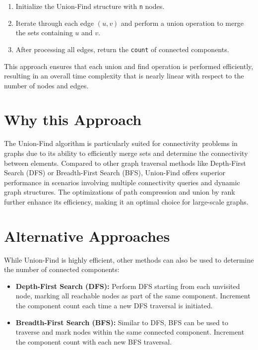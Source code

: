 \begin{enumerate}
    \item Initialize the Union-Find structure with \texttt{n} nodes.
    \item Iterate through each edge \((u, v)\) and perform a union operation to merge the sets containing \(u\) and \(v\).
    \item After processing all edges, return the \texttt{count} of connected components.
\end{enumerate}

This approach ensures that each union and find operation is performed efficiently, resulting in an overall time complexity that is nearly linear with respect to the number of nodes and edges.

\section*{Why this Approach}

The Union-Find algorithm is particularly suited for connectivity problems in graphs due to its ability to efficiently merge sets and determine the connectivity between elements. Compared to other graph traversal methods like Depth-First Search (DFS) or Breadth-First Search (BFS), Union-Find offers superior performance in scenarios involving multiple connectivity queries and dynamic graph structures. The optimizations of path compression and union by rank further enhance its efficiency, making it an optimal choice for large-scale graphs.

\section*{Alternative Approaches}

While Union-Find is highly efficient, other methods can also be used to determine the number of connected components:

\begin{itemize}
    \item \textbf{Depth-First Search (DFS):}  
    Perform DFS starting from each unvisited node, marking all reachable nodes as part of the same component. Increment the component count each time a new DFS traversal is initiated.
    
    \item \textbf{Breadth-First Search (BFS):}  
    Similar to DFS, BFS can be used to traverse and mark nodes within the same connected component. Increment the component count with each new BFS traversal.
\end{itemize}


